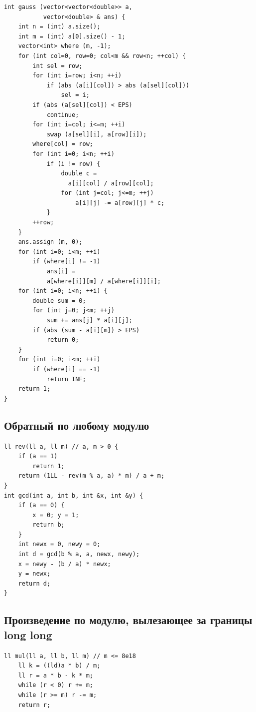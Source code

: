 \documentclass[10pt, portrait,letterpaper]{article}
\begin{document}
\begin{verbatim}
int gauss (vector<vector<double>> a,
           vector<double> & ans) {
    int n = (int) a.size();
    int m = (int) a[0].size() - 1;
    vector<int> where (m, -1);
    for (int col=0, row=0; col<m && row<n; ++col) {
        int sel = row;
        for (int i=row; i<n; ++i)
            if (abs (a[i][col]) > abs (a[sel][col]))
                sel = i;
        if (abs (a[sel][col]) < EPS)
            continue;
        for (int i=col; i<=m; ++i)
            swap (a[sel][i], a[row][i]);
        where[col] = row;
        for (int i=0; i<n; ++i)
            if (i != row) {
                double c = 
                  a[i][col] / a[row][col];
                for (int j=col; j<=m; ++j)
                    a[i][j] -= a[row][j] * c;
            }
        ++row;
    }
    ans.assign (m, 0);
    for (int i=0; i<m; ++i)
        if (where[i] != -1)
            ans[i] = 
            a[where[i]][m] / a[where[i]][i];
    for (int i=0; i<n; ++i) {
        double sum = 0;
        for (int j=0; j<m; ++j)
            sum += ans[j] * a[i][j];
        if (abs (sum - a[i][m]) > EPS)
            return 0;
    }
    for (int i=0; i<m; ++i)
        if (where[i] == -1)
            return INF;
    return 1;
}

\end{verbatim}

\subsection{Обратный по любому модулю}

\begin{verbatim}
ll rev(ll a, ll m) // a, m > 0 {
    if (a == 1)
        return 1;
    return (1LL - rev(m % a, a) * m) / a + m;
}
int gcd(int a, int b, int &x, int &y) {
	if (a == 0) {
		x = 0; y = 1;
		return b;
	}
	int newx = 0, newy = 0;
	int d = gcd(b % a, a, newx, newy);
	x = newy - (b / a) * newx;
	y = newx;
	return d;
}
\end{verbatim}

\subsection{Произведение по модулю, вылезающее за границы long long}
\begin{verbatim}
ll mul(ll a, ll b, ll m) // m <= 8e18
    ll k = ((ld)a * b) / m;
    ll r = a * b - k * m;
    while (r < 0) r += m;
    while (r >= m) r -= m;
    return r;
\end{verbatim}
\end{document}
